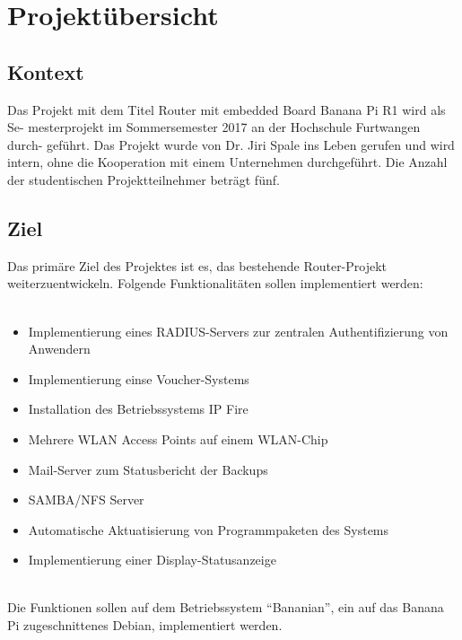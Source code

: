 \chapter{Projektübersicht}

\section{Kontext}
Das Projekt mit dem Titel Router mit embedded Board Banana Pi R1 wird als Se-
mesterprojekt im Sommersemester 2017 an der Hochschule Furtwangen durch-
geführt. Das Projekt wurde von Dr. Jiri Spale ins Leben gerufen und wird
intern, ohne die Kooperation mit einem Unternehmen durchgeführt. Die Anzahl der studentischen Projektteilnehmer beträgt fünf.

\section{Ziel}
Das primäre Ziel des Projektes ist es, das bestehende Router-Projekt weiterzuentwickeln. Folgende Funktionalitäten sollen implementiert werden:\\
~\\
\begin{itemize}
\item Implementierung eines RADIUS-Servers zur zentralen Authentifizierung von Anwendern
\item Implementierung einse Voucher-Systems
\item Installation des Betriebssystems IP Fire
\item Mehrere WLAN Access Points auf einem WLAN-Chip
\item Mail-Server zum Statusbericht der Backups
\item SAMBA/NFS Server
\item Automatische Aktuatisierung von Programmpaketen des Systems
\item Implementierung einer Display-Statusanzeige
\end{itemize}
~\\
Die Funktionen sollen auf dem Betriebssystem “Bananian”, ein auf das Banana Pi zugeschnittenes Debian, implementiert werden.
